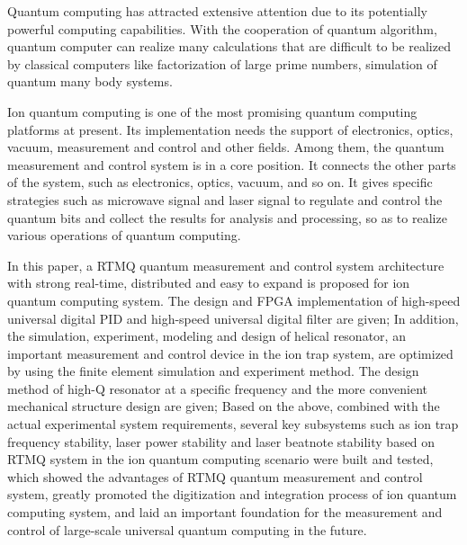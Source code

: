 \begin{abstract*}
  Quantum computing has attracted extensive attention due to its potentially powerful computing capabilities. With the cooperation of quantum algorithm, quantum computer can realize many calculations that are difficult to be realized by classical computers like factorization of large prime numbers, simulation of quantum many body systems. 

  Ion quantum computing is one of the most promising quantum computing platforms at present. Its implementation needs the support of electronics, optics, vacuum, measurement and control and other fields. Among them, the quantum measurement and control system is in a core position. It connects the other parts of the system, such as electronics, optics, vacuum, and so on. It gives specific strategies such as microwave signal and laser signal to regulate and control the quantum bits and collect the results for analysis and processing, so as to realize various operations of quantum computing.

  In this paper, a RTMQ quantum measurement and control system architecture with strong real-time, distributed and easy to expand is proposed for ion quantum computing system. The design and FPGA implementation of high-speed universal digital PID and high-speed universal digital filter are given;
  In addition, the simulation, experiment, modeling and design of helical resonator, an important measurement and control device in the ion trap system, are optimized by using the finite element simulation and experiment method. The design method of high-Q resonator at a specific frequency and the more convenient mechanical structure design are given;
  Based on the above, combined with the actual experimental system requirements, several key subsystems such as ion trap frequency stability, laser power stability and laser beatnote stability based on RTMQ system in the ion quantum computing scenario were built and tested, which showed the advantages of RTMQ quantum measurement and control system, greatly promoted the digitization and integration process of ion quantum computing system, and laid an important foundation for the measurement and control of large-scale universal quantum computing in the future.


\end{abstract*}

